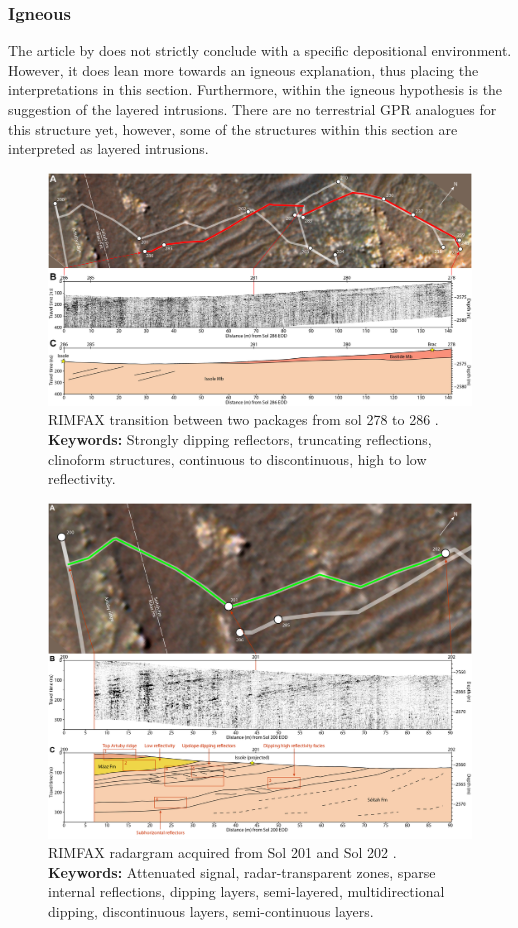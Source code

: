\clearpage
\subsubsection{Igneous}
The article by \citet{Hamran2022} does not strictly conclude with a specific depositional environment. However, it does lean more towards an igneous explanation, thus placing the interpretations in this section. Furthermore, within the igneous hypothesis is the suggestion of the layered intrusions. There are no terrestrial GPR analogues for this structure yet, however, some of the structures within this section are interpreted as layered intrusions. 
\begin{figure}[h!]
    \centering
    \includegraphics[width=0.9\linewidth]{Figures/0.5RIMFAX/Hamran_2022-f3.jpg}
    \caption[RIMFAX transition between two packages from sol 278 to 286]{RIMFAX transition between two packages from sol 278 to 286 \citep{Hamran2022}. \textbf{Keywords:} Strongly dipping reflectors, truncating reflections, clinoform structures, continuous to discontinuous, high to low reflectivity.}
    \label{fig:Hamran22-3}
\end{figure}

\begin{figure}[h!]
    \centering
    \includegraphics[width=0.9\linewidth]{Figures/0.5RIMFAX/Hamran_2022-f4.jpg}
    \caption[RIMFAX radargram acquired from Sol 201 and Sol 202.]{RIMFAX radargram acquired from Sol 201 and Sol 202 \citep{Hamran2022}. \textbf{Keywords:} Attenuated signal, radar-transparent zones, sparse internal reflections, dipping layers, semi-layered, multidirectional dipping, discontinuous layers, semi-continuous layers.}
    \label{fig:Hamran22-4}
\end{figure}

